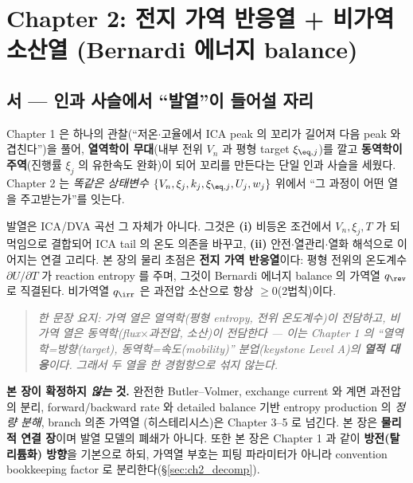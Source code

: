\section{Chapter 2: 전지 가역 반응열 + 비가역 소산열 (Bernardi 에너지 balance)}\label{chap:ch2}

\subsection*{서 — 인과 사슬에서 ``발열''이 들어설 자리}
Chapter 1 은 하나의 관찰(``저온$\cdot$고율에서 ICA peak 의 꼬리가 길어져 다음 peak 와 겹친다'')을 풀어,
\textbf{열역학이 무대}(내부 전위 $V_n$ 과 평형 target $\xi_{\eq,j}$)를 깔고 \textbf{동역학이 주역}(진행률 $\xi_j$
의 유한속도 완화)이 되어 꼬리를 만든다는 단일 인과 사슬을 세웠다. Chapter 2 는 \emph{똑같은 상태변수}
$\{V_n,\xi_j,k_j,\xi_{\eq,j},U_j,w_j\}$ 위에서 ``그 과정이 어떤 열을 주고받는가''를 잇는다.

발열은 ICA/DVA 곡선 그 자체가 아니다. 그것은 \textbf{(i)} 비등온 조건에서 $V_n,\xi_j,T$ 가 되먹임으로 결합되어
ICA tail 의 온도 의존을 바꾸고, \textbf{(ii)} 안전$\cdot$열관리$\cdot$열화 해석으로 이어지는 연결 고리다. 본 장의
물리 초점은 \textbf{전지 가역 반응열}이다: 평형 전위의 온도계수 $\partial U/\partial T$ 가 reaction entropy 를
주며, 그것이 Bernardi 에너지 balance 의 가역열 $q_\rev$ 로 직결된다. 비가역열 $q_\irr$ 은 과전압 소산으로
항상 $\ge0$(2법칙)이다.

\begin{quote}\itshape
한 문장 요지: 가역 열은 열역학(평형 entropy, 전위 온도계수)이 전담하고, 비가역 열은 동역학(flux$\times$과전압,
소산)이 전담한다 — 이는 Chapter 1 의 ``열역학=방향(target), 동역학=속도(mobility)'' 분업(keystone Level A)의
\textbf{열적 대응}이다. 그래서 두 열을 한 경험항으로 섞지 않는다.
\end{quote}

\noindent\textbf{본 장이 확정하지 \emph{않는} 것.} 완전한 Butler--Volmer, exchange current 와 계면 과전압의
분리, forward/backward rate 와 detailed balance 기반 entropy production 의 \emph{정량 분해}, branch 의존 가역열
(히스테리시스)은 Chapter 3--5 로 넘긴다. 본 장은 \textbf{물리적 연결 장}이며 발열 모델의 폐쇄가 아니다. 또한 본
장은 Chapter 1 과 같이 \textbf{방전(탈리튬화) 방향}을 기본으로 하되, 가역열 부호는 피팅 파라미터가 아니라
convention bookkeeping factor 로 분리한다(\S\ref{sec:ch2_decomp}).

